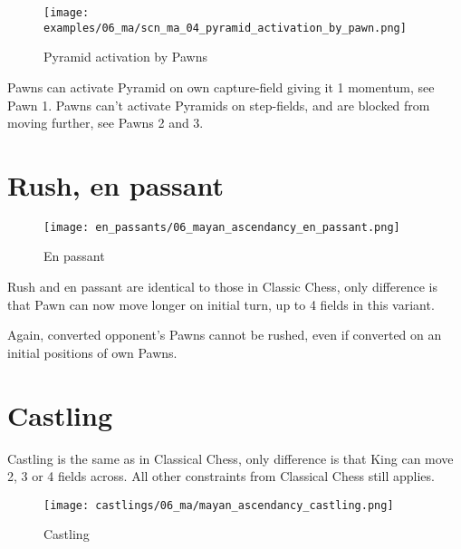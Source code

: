 \noindent
\begin{figure}[!h]
\texttt{[image: examples/06\_ma/scn\_ma\_04\_pyramid\_activation\_by\_pawn.png]}
\caption{Pyramid activation by Pawns}
\label{fig:scn_ma_04_pyramid_activation_by_pawn}
\end{figure}

Pawns can activate Pyramid on own capture-field giving it 1 momentum, see Pawn 1.
Pawns can't activate Pyramids on step-fields, and are blocked from moving further,
see Pawns 2 and 3.

\clearpage %

\section*{Rush, en passant}
\label{sec:Mayan Ascendancy/Rush, en passant}

\noindent
\begin{wrapfigure}{l}{0.4\textwidth}
\centering
\texttt{[image: en\_passants/06\_mayan\_ascendancy\_en\_passant.png]}
\caption{En passant}
\label{fig:06_mayan_ascendancy_en_passant}
\end{wrapfigure}
Rush and en passant are identical to those in Classic Chess, only difference
is that Pawn can now move longer on initial turn, up to 4 fields in this
variant.

Again, converted opponent's Pawns cannot be rushed, even if converted on an
initial positions of own Pawns.

\clearpage %

\section*{Castling}
\label{sec:Mayan Ascendancy/Castling}

Castling is the same as in Classical Chess, only difference is that King can move 2, 3 or 4 fields across.
All other constraints from Classical Chess still applies.

\noindent
\begin{figure}[!h]
\texttt{[image: castlings/06\_ma/mayan\_ascendancy\_castling.png]}
\caption{Castling}
\label{fig:mayan_ascendancy_castling}
\end{figure}

